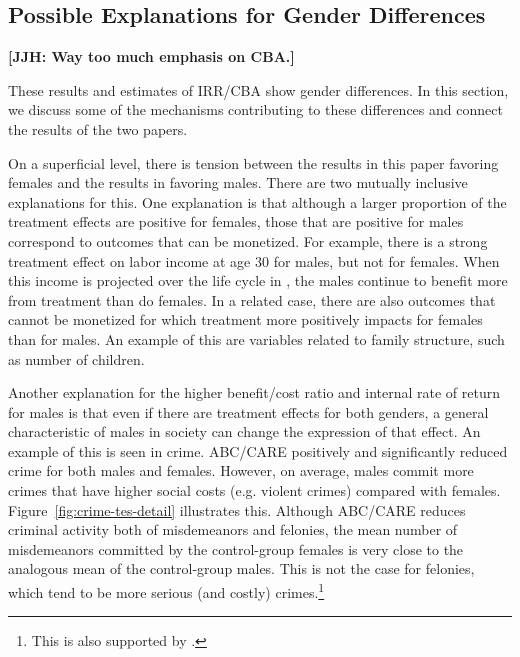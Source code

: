 \subsection{Possible Explanations for Gender Differences}

\textbf{[JJH: Way too much emphasis on CBA.]}

These results and estimates of IRR/CBA \citep{Garcia_Heckman_Leaf_etal_2017_Comp_CBA_Unpublished} show gender differences. In this section, we discuss some of the mechanisms contributing to these differences and connect the results of the two papers.

On a superficial level, there is tension between the results in this paper favoring females and the results in \citet{Garcia_Heckman_Leaf_etal_2017_Comp_CBA_Unpublished} favoring males. There are two mutually inclusive explanations for this. One explanation is that although a larger proportion of the treatment effects are positive for females, those that are positive for males correspond to outcomes that can be monetized. For example, there is a strong treatment effect on labor income at age 30 for males, but not for females. When this income is projected over the life cycle in \citet{Garcia_Heckman_Leaf_etal_2017_Comp_CBA_Unpublished}, the males continue to benefit more from treatment than do females. In a related case, there are also outcomes that cannot be monetized for which treatment more positively impacts for females than for males. An example of this are variables related to family structure, such as number of children.

Another explanation for the higher benefit/cost ratio and internal rate of return for males is that even if there are treatment effects for both genders, a general characteristic of males in society can change the expression of that effect. An example of this is seen in crime. ABC/CARE positively and significantly reduced crime for both males and females. However, on average, males commit more crimes that have higher social costs (e.g. violent crimes) compared with females. Figure~\ref{fig:crime-tes-detail} illustrates this. Although ABC/CARE reduces criminal activity both of misdemeanors and felonies, the mean number of misdemeanors committed by the control-group females is very close to the analogous mean of the control-group males. This is not the case for felonies, which tend to be more serious (and costly) crimes.\footnote{This is also supported by \citet{Cohen-Bowles_2010_Estimating-Cost-Crime,Gregg_etal_2015_SocialRealities_BOOK,UDOJ_2016_PrisonersStatistics_Bulletin}.}

